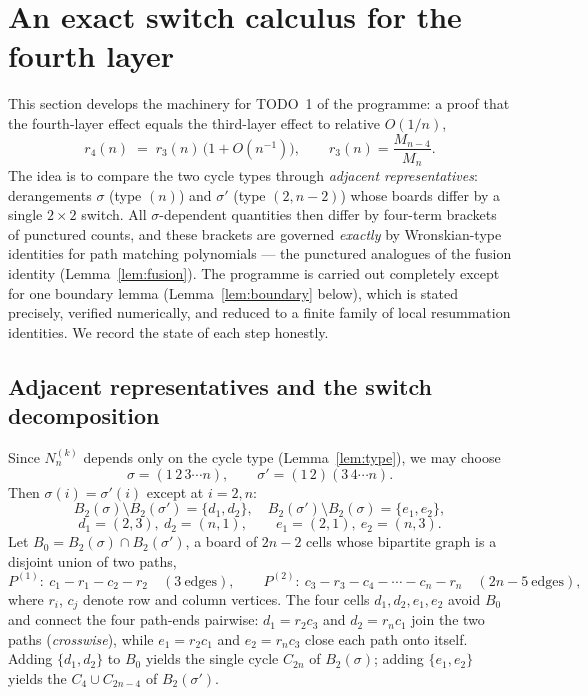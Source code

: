\section{An exact switch calculus for the fourth layer}\label{sec:switch}

This section develops the machinery for TODO~1 of the programme: a proof
that the fourth-layer effect equals the third-layer effect to relative
$O(1/n)$,
\begin{equation}\label{eq:r4thm}
r_4(n)\;=\;r_3(n)\,\bigl(1+O(n^{-1})\bigr),
\qquad r_3(n)=\frac{M_{n-4}}{M_n}.
\end{equation}
The idea is to compare the two cycle types through \emph{adjacent
representatives}: derangements $\sigma$ (type $(n)$) and $\sigma'$ (type
$(2,n-2)$) whose boards differ by a single $2\times2$ switch.  All
$\sigma$-dependent quantities then differ by four-term brackets of
punctured counts, and these brackets are governed \emph{exactly} by
Wronskian-type identities for path matching polynomials --- the punctured
analogues of the fusion identity (Lemma~\ref{lem:fusion}).  The programme
is carried out completely except for one boundary lemma
(Lemma~\ref{lem:boundary} below), which is stated precisely, verified
numerically, and reduced to a finite family of local resummation
identities.  We record the state of each step honestly.

\subsection{Adjacent representatives and the switch decomposition}

Since $N^{(k)}_n$ depends only on the cycle type
(Lemma~\ref{lem:type}), we may choose
\[
\sigma=(1\,2\,3\cdots n),\qquad \sigma'=(1\,2)(3\,4\cdots n).
\]
Then $\sigma(i)=\sigma'(i)$ except at $i=2,n$:
\[
B_2(\sigma)\setminus B_2(\sigma')=\{d_1,d_2\},\quad
B_2(\sigma')\setminus B_2(\sigma)=\{e_1,e_2\},
\]
\[
d_1=(2,3),\ d_2=(n,1),\qquad e_1=(2,1),\ e_2=(n,3).
\]
Let $B_0=B_2(\sigma)\cap B_2(\sigma')$, a board of $2n-2$ cells whose
bipartite graph is a disjoint union of two paths,
\[
P^{(1)}:\ c_1-r_1-c_2-r_2\quad(3\ \text{edges}),\qquad
P^{(2)}:\ c_3-r_3-c_4-\cdots-c_n-r_n\quad(2n-5\ \text{edges}),
\]
where $r_i$, $c_j$ denote row and column vertices.  The four cells
$d_1,d_2,e_1,e_2$ avoid $B_0$ and connect the four path-ends pairwise:
$d_1=r_2c_3$ and $d_2=r_nc_1$ join the two paths (\emph{crosswise}),
while $e_1=r_2c_1$ and $e_2=r_nc_3$ close each path onto itself.
Adding $\{d_1,d_2\}$ to $B_0$ yields the single cycle $C_{2n}$ of
$B_2(\sigma)$; adding $\{e_1,e_2\}$ yields the $C_4\cup C_{2n-4}$ of
$B_2(\sigma')$.

